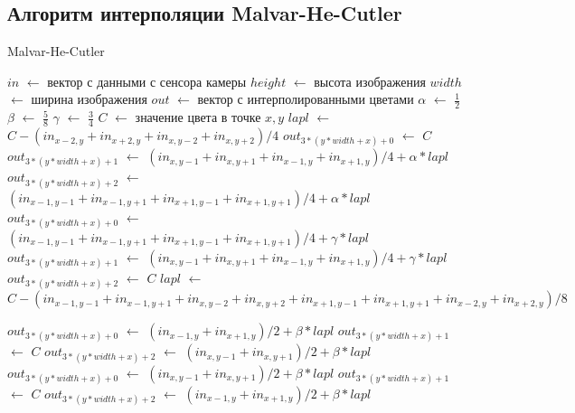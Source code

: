 \subsection{Алгоритм интерполяции Malvar-He-Cutler}
\begin{algorithm}[H]
	\caption{Malvar-He-Cutler}
	\label{alg:mhc1}
	\begin{algorithmic}[1]
		\State $in$ $\gets$ вектор с данными с сенсора камеры
		\State $height$ $\gets$ высота изображения
		\State $width$ $\gets$ ширина изображения
		\State $out$ $\gets$ вектор с интерполированными цветами
		\State $\alpha$ $\gets$ $\frac{1}{2}$
		\State $\beta$ $\gets$ $\frac{5}{8}$
		\State $\gamma$ $\gets$ $\frac{3}{4}$
		\State $C$ $\gets$ значение цвета в точке $x,y$
		\State $lapl$ $\gets$ $C - (in_{x-2, y} + in_{x+2, y} + in_{x, y-2} + in_{x, y+2}) / 4$
		\State $out_{3 * (y * width + x) + 0}$ $\gets$ $C$
		\State $out_{3 * (y * width + x) + 1}$ $\gets$ $(in_{x, y-1} + in_{x, y + 1} + in_{x - 1, y} + in_{x + 1, y}) / 4 + \alpha * lapl$
		\State $out_{3 * (y * width + x) + 2}$ $\gets$ $(in_{x-1, y-1} + in_{x-1, y+1} + in_{x+1, y-1} + in_{x+1, y+1}) / 4 + \alpha * lapl$
		\EndIf
		\State $out_{3 * (y * width + x) + 0}$ $\gets$ $(in_{x-1, y-1} + in_{x-1, y+1} + in_{x+1, y-1} + in_{x+1, y+1}) / 4 + \gamma * lapl$
		\State $out_{3 * (y * width + x) + 1}$ $\gets$ $(in_{x, y-1} + in_{x, y + 1} + in_{x - 1, y} + in_{x + 1, y}) / 4 + \gamma * lapl$
		\State $out_{3 * (y * width + x) + 2}$ $\gets$ $C$
		\EndIf
		\State $lapl$ $\gets$ $C - (in_{x-1, y-1} + in_{x-1, y+1} + in_{x, y-2} + in_{x, y+2}+ in_{x+1, y-1}+ in_{x+1, y+1}+ in_{x-2, y}+ in_{x+2, y}) / 8$
	\end{algorithmic}
\end{algorithm}

\begin{algorithm}
	\begin{algorithmic}[1]
	\State $out_{3 * (y * width + x) + 0}$ $\gets$ $(in_{x-1, y} + in_{x+1, y}) / 2 + \beta * lapl$
	\State $out_{3 * (y * width + x) + 1}$ $\gets$ $C$
	\State $out_{3 * (y * width + x) + 2}$ $\gets$ $(in_{x, y - 1} + in_{x, y+1}) / 2 + \beta * lapl$
	\EndIf
	\State $out_{3 * (y * width + x) + 0}$ $\gets$ $(in_{x, y - 1} + in_{x, y+1}) / 2 + \beta * lapl$
	\State $out_{3 * (y * width + x) + 1}$ $\gets$ $C$
	\State $out_{3 * (y * width + x) + 2}$ $\gets$ $(in_{x-1, y} + in_{x+1, y}) / 2 + \beta * lapl$
	\EndIf
	\EndFor
	\EndFor
	\end{algorithmic}
\end{algorithm}
\clearpage


